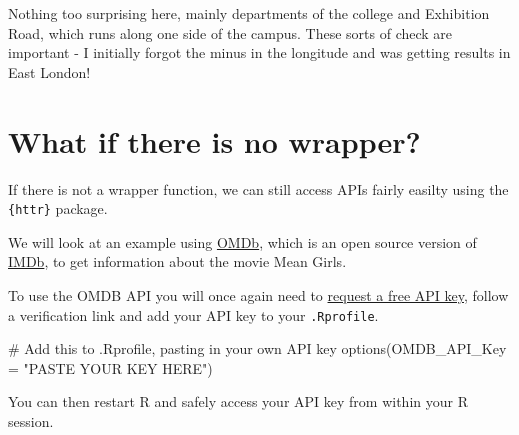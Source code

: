 \documentclass[
  letterpaper,
  DIV=11,
  numbers=noendperiod]{scrreprt}
\newenvironment{Shaded}{\begin{snugshade}}{\end{snugshade}}
\newcommand{\AttributeTok}[1]{\textcolor[rgb]{0.40,0.45,0.13}{#1}}
\newcommand{\CommentTok}[1]{\textcolor[rgb]{0.37,0.37,0.37}{#1}}
\newcommand{\DecValTok}[1]{\textcolor[rgb]{0.68,0.00,0.00}{#1}}
\newcommand{\FunctionTok}[1]{\textcolor[rgb]{0.28,0.35,0.67}{#1}}
\newcommand{\NormalTok}[1]{\textcolor[rgb]{0.00,0.23,0.31}{#1}}
\newcommand{\SpecialCharTok}[1]{\textcolor[rgb]{0.37,0.37,0.37}{#1}}
\newcommand{\StringTok}[1]{\textcolor[rgb]{0.13,0.47,0.30}{#1}}
\begin{document}
\begin{Shaded}
\end{Shaded}

Nothing too surprising here, mainly departments of the college and
Exhibition Road, which runs along one side of the campus. These sorts of
check are important - I initially forgot the minus in the longitude and
was getting results in East London!

\section{What if there is no
wrapper?}\label{what-if-there-is-no-wrapper}

If there is not a wrapper function, we can still access APIs fairly
easilty using the \texttt{\{httr\}} package.

We will look at an example using \href{http://www.omdbapi.com/}{OMDb},
which is an open source version of \href{https://www.imdb.com/}{IMDb},
to get information about the movie Mean Girls.

To use the OMDB API you will once again need to
\href{http://www.omdbapi.com/apikey.aspx}{request a free API key},
follow a verification link and add your API key to your
\texttt{.Rprofile}.

\begin{Shaded}
\begin{Highlighting}[]
\CommentTok{\# Add this to .Rprofile, pasting in your own API key}
\FunctionTok{options}\NormalTok{(}\AttributeTok{OMDB\_API\_Key =} \StringTok{"PASTE YOUR KEY HERE"}\NormalTok{)}
\end{Highlighting}
\end{Shaded}

You can then restart R and safely access your API key from within your R
session.
\end{document}
